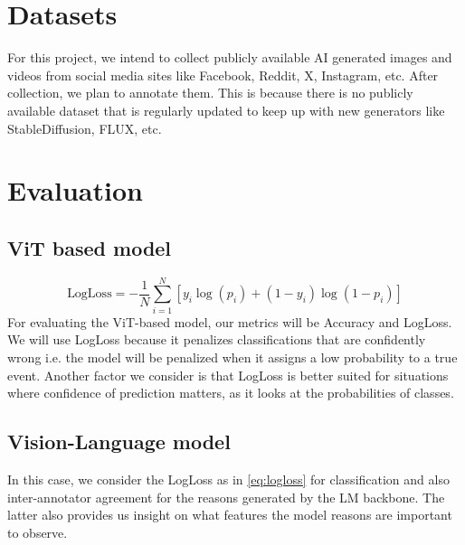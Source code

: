 \documentclass[10pt,twocolumn,letterpaper]{article}
\begin{document}
\section{Datasets}
For this project, we intend to collect publicly available AI generated images  and videos from social media sites like Facebook, Reddit, X, Instagram, etc. After collection, we plan to annotate them. This is because there is no publicly available dataset that is regularly updated to keep up with new generators like StableDiffusion, FLUX, etc. 

\section{Evaluation}

\subsection{ViT based model}
\begin{equation}
\text{LogLoss} = - \frac{1}{N} \sum_{i=1}^{N}[y_{i}\log(p_i) + (1 - y_{i}) \log(1 - p_i)]
\label{eq:logloss}
\end{equation}
For evaluating the ViT-based model, our metrics will be Accuracy and LogLoss. We will use LogLoss because it penalizes classifications that are confidently wrong i.e. the model will be penalized when it assigns a low probability to a true event. Another factor we consider is that LogLoss is better suited for situations where confidence of prediction matters, as it looks at the probabilities of classes.

\subsection{Vision-Language model}
In this case, we consider the LogLoss as in \ref{eq:logloss} for classification and also inter-annotator agreement for the reasons generated by the LM backbone. The latter also provides us insight on what features the model reasons are important to observe. 
{\small


}
\end{document}
